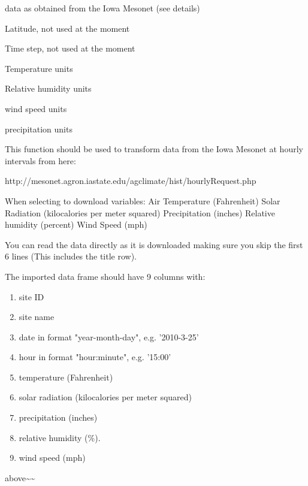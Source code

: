 \documentclass[letterpaper]{book}
\begin{document}
%
\begin{Arguments}
\begin{ldescription}
\item[\code{data}] data as obtained from the Iowa Mesonet (see
details)

\item[\code{lati}] Latitude, not used at the moment

\item[\code{ts}] Time step, not used at the moment

\item[\code{temp.units}] Temperature units

\item[\code{rh.units}] Relative humidity units

\item[\code{ws.units}] wind speed units

\item[\code{pp.units}] precipitation units

\item[\code{...}] 
\end{ldescription}
\end{Arguments}
%
\begin{Details}\relax
This function should be used to transform data from the
Iowa Mesonet at hourly intervals from here:

http://mesonet.agron.iastate.edu/agclimate/hist/hourlyRequest.php

When selecting to download variables: Air Temperature
(Fahrenheit) Solar Radiation (kilocalories per meter
squared) Precipitation (inches) Relative humidity (percent)
Wind Speed (mph)

You can read the data directly as it is downloaded making
sure you skip the first 6 lines (This includes the title
row).

The imported data frame should have 9 columns with:

\begin{enumerate}


\item site ID \item site name \item date in format
"year-month-day", e.g. '2010-3-25' \item hour in format
"hour:minute", e.g. '15:00' \item temperature
(Fahrenheit) \item solar radiation (kilocalories per meter
squared) \item precipitation (inches) \item relative
humidity (\%). \item wind speed (mph) 
\end{enumerate}



above\textasciitilde{}\textasciitilde{}
\end{Details}
\end{document}
